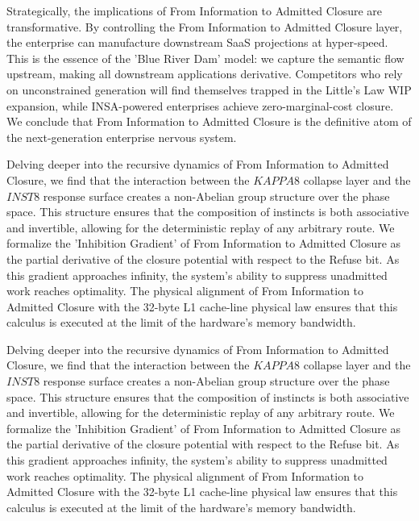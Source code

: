 \documentclass[12pt,a4paper,oneside]{book}
\begin{document}
Strategically, the implications of From Information to Admitted Closure are transformative. By controlling the From Information to Admitted Closure layer, the enterprise can manufacture downstream SaaS projections at hyper-speed. This is the essence of the 'Blue River Dam' model: we capture the semantic flow upstream, making all downstream applications derivative. Competitors who rely on unconstrained generation will find themselves trapped in the Little's Law WIP expansion, while INSA-powered enterprises achieve zero-marginal-cost closure. We conclude that From Information to Admitted Closure is the definitive atom of the next-generation enterprise nervous system. 

Delving deeper into the recursive dynamics of From Information to Admitted Closure, we find that the interaction between the $KAPPA8$ collapse layer and the $INST8$ response surface creates a non-Abelian group structure over the phase space. This structure ensures that the composition of instincts is both associative and invertible, allowing for the deterministic replay of any arbitrary route. We formalize the 'Inhibition Gradient' of From Information to Admitted Closure as the partial derivative of the closure potential with respect to the Refuse bit. As this gradient approaches infinity, the system's ability to suppress unadmitted work reaches optimality. The physical alignment of From Information to Admitted Closure with the 32-byte L1 cache-line physical law ensures that this calculus is executed at the limit of the hardware's memory bandwidth. 

Delving deeper into the recursive dynamics of From Information to Admitted Closure, we find that the interaction between the $KAPPA8$ collapse layer and the $INST8$ response surface creates a non-Abelian group structure over the phase space. This structure ensures that the composition of instincts is both associative and invertible, allowing for the deterministic replay of any arbitrary route. We formalize the 'Inhibition Gradient' of From Information to Admitted Closure as the partial derivative of the closure potential with respect to the Refuse bit. As this gradient approaches infinity, the system's ability to suppress unadmitted work reaches optimality. The physical alignment of From Information to Admitted Closure with the 32-byte L1 cache-line physical law ensures that this calculus is executed at the limit of the hardware's memory bandwidth. 
\end{document}
